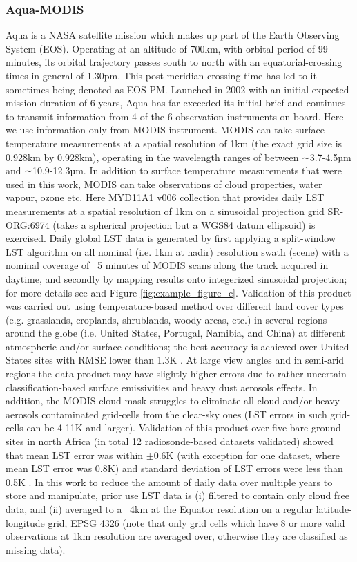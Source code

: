 \documentclass[hess, twostagejnl]{copernicus}
\begin{document}
\subsubsection{Aqua-MODIS}


\noindent Aqua  \citep{aquaref} is a NASA satellite mission which makes up part of the Earth Observing System (EOS). Operating at an altitude of 700km, with orbital period of 99 minutes, its orbital trajectory passes south to north with an equatorial-crossing times in general of 1.30pm. This post-meridian crossing time has led to it sometimes being denoted as EOS PM. Launched in 2002 with an initial expected mission duration of 6 years, Aqua has far exceeded its initial brief and continues to transmit information from 4 of the 6 observation instruments on board. Here we use information only from MODIS instrument. MODIS can take surface temperature measurements at a spatial resolution of 1km (the exact grid size is 0.928km by 0.928km), operating in the wavelength ranges of between ∼3.7-4.5µm and ∼10.9-12.3µm. In addition to surface temperature measurements that were used in this work, MODIS can take observations of cloud properties, water vapour, ozone etc. Here MYD11A1 v006 \citep{MODISusersguide} collection that provides daily LST measurements at a spatial resolution of 1km on a sinusoidal projection grid SR-ORG:6974 (takes a spherical projection but a WGS84 datum ellipsoid) is exercised. Daily global LST data is generated by first applying a split-window LST algorithm \citep{508406} on all nominal (i.e. 1km at nadir) resolution swath (scene) with a nominal coverage of ~5 minutes of MODIS scans along the track acquired in daytime, and secondly by mapping results onto integerized sinusoidal projection; for more details see \citep{MODISusersguide} and Figure \ref{fig:example_figure_c}. Validation of this product was carried out using temperature-based method over different land cover types (e.g. grasslands, croplands, shrublands, woody areas, etc.) in several regions around the globe (i.e. United States, Portugal, Namibia, and China) at different atmospheric and/or surface conditions; the best accuracy is achieved over United States sites with RMSE lower than 1.3K \citep{DUAN201916}. At large view angles and in semi-arid regions the data product may have slightly higher errors due to rather uncertain classification-based surface emissivities and heavy dust aerosols effects. In addition, the MODIS cloud mask struggles to eliminate all cloud and/or heavy aerosols contaminated grid-cells from the clear-sky ones (LST errors in such grid-cells can be 4-11K and larger). Validation of this product over five bare ground sites in north Africa (in total 12 radiosonde-based datasets validated) showed that mean LST error was within $\pm$0.6K (with exception for one dataset, where mean LST error was 0.8K) and standard deviation of LST errors were less than 0.5K \cite{DUAN201916}. In this work to reduce the amount of daily data over multiple years to store and manipulate, prior use LST data is (i) filtered to contain only cloud free data, and (ii) averaged to a ~4km at the Equator resolution on a regular latitude-longitude grid, EPSG 4326 (note that only grid cells which have 8 or more valid observations at 1km resolution are averaged over, otherwise they are classified as missing data).
\end{document}
